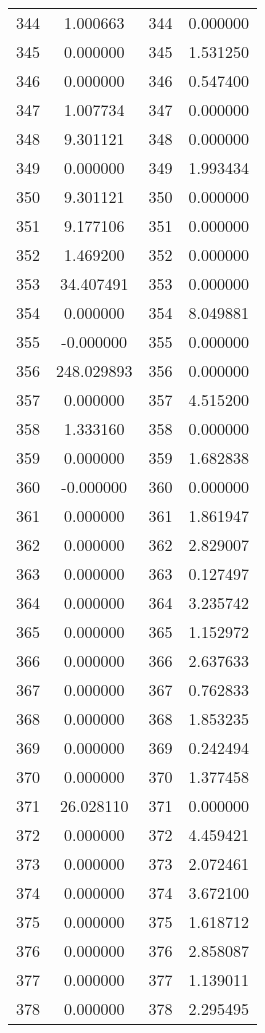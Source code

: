 \documentclass[12pt]{article}
\begin{document}
\begin{longtable}{@{}cccc@{}}
344 & 1.000663 & 344 & 0.000000 \\
345 & 0.000000 & 345 & 1.531250 \\
346 & 0.000000 & 346 & 0.547400 \\
347 & 1.007734 & 347 & 0.000000 \\
348 & 9.301121 & 348 & 0.000000 \\
349 & 0.000000 & 349 & 1.993434 \\
350 & 9.301121 & 350 & 0.000000 \\
351 & 9.177106 & 351 & 0.000000 \\
352 & 1.469200 & 352 & 0.000000 \\
353 & 34.407491 & 353 & 0.000000 \\
354 & 0.000000 & 354 & 8.049881 \\
355 & -0.000000 & 355 & 0.000000 \\
356 & 248.029893 & 356 & 0.000000 \\
357 & 0.000000 & 357 & 4.515200 \\
358 & 1.333160 & 358 & 0.000000 \\
359 & 0.000000 & 359 & 1.682838 \\
360 & -0.000000 & 360 & 0.000000 \\
361 & 0.000000 & 361 & 1.861947 \\
362 & 0.000000 & 362 & 2.829007 \\
363 & 0.000000 & 363 & 0.127497 \\
364 & 0.000000 & 364 & 3.235742 \\
365 & 0.000000 & 365 & 1.152972 \\
366 & 0.000000 & 366 & 2.637633 \\
367 & 0.000000 & 367 & 0.762833 \\
368 & 0.000000 & 368 & 1.853235 \\
369 & 0.000000 & 369 & 0.242494 \\
370 & 0.000000 & 370 & 1.377458 \\
371 & 26.028110 & 371 & 0.000000 \\
372 & 0.000000 & 372 & 4.459421 \\
373 & 0.000000 & 373 & 2.072461 \\
374 & 0.000000 & 374 & 3.672100 \\
375 & 0.000000 & 375 & 1.618712 \\
376 & 0.000000 & 376 & 2.858087 \\
377 & 0.000000 & 377 & 1.139011 \\
378 & 0.000000 & 378 & 2.295495 \\

\end{longtable}
\end{document}
